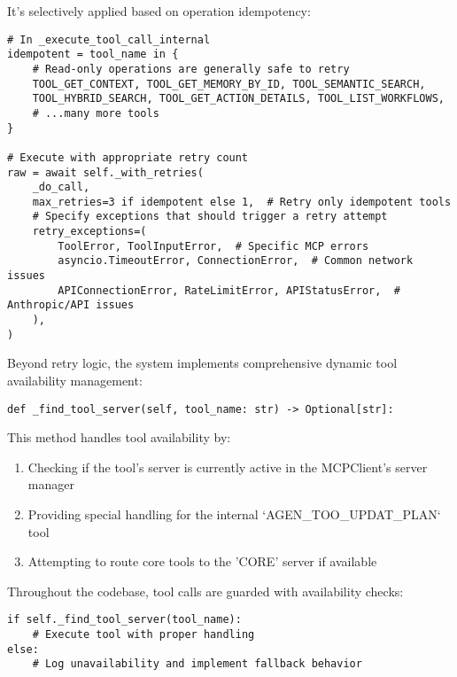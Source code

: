 \documentclass[12pt,a4paper]{article}
\begin{document}
It's selectively applied based on operation idempotency:
\begin{pageablecode}
\begin{verbatim}
# In _execute_tool_call_internal
idempotent = tool_name in {
    # Read-only operations are generally safe to retry
    TOOL_GET_CONTEXT, TOOL_GET_MEMORY_BY_ID, TOOL_SEMANTIC_SEARCH,
    TOOL_HYBRID_SEARCH, TOOL_GET_ACTION_DETAILS, TOOL_LIST_WORKFLOWS,
    # ...many more tools
}

# Execute with appropriate retry count
raw = await self._with_retries(
    _do_call,
    max_retries=3 if idempotent else 1,  # Retry only idempotent tools
    # Specify exceptions that should trigger a retry attempt
    retry_exceptions=(
        ToolError, ToolInputError,  # Specific MCP errors
        asyncio.TimeoutError, ConnectionError,  # Common network issues
        APIConnectionError, RateLimitError, APIStatusError,  # Anthropic/API issues
    ),
)
\end{verbatim}
\end{pageablecode}

Beyond retry logic, the system implements comprehensive dynamic tool availability management:
\begin{pageablecode}
\begin{verbatim}
def _find_tool_server(self, tool_name: str) -> Optional[str]:
\end{verbatim}
\end{pageablecode}
This method handles tool availability by:
\begin{enumerate}[label=\arabic*.]
    \item Checking if the tool's server is currently active in the MCPClient's server manager
    \item Providing special handling for the internal `AGEN\1\_TOO\1\_UPDAT\1\_PLAN` tool
    \item Attempting to route core tools to the 'CORE' server if available
\end{enumerate}

Throughout the codebase, tool calls are guarded with availability checks:
\begin{pageablecode}
\begin{verbatim}
if self._find_tool_server(tool_name):
    # Execute tool with proper handling
else:
    # Log unavailability and implement fallback behavior
\end{verbatim}
\end{pageablecode}
\end{document}
